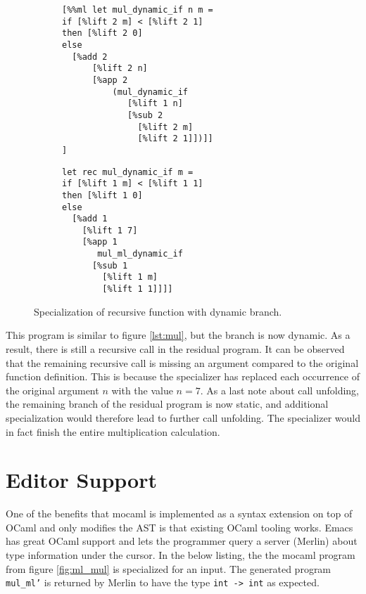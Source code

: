 \begin{figure}[H]
  \centering
  \begin{subfigure}[t]{0.49\linewidth}
\begin{verbatim}
[%%ml let mul_dynamic_if n m =
if [%lift 2 m] < [%lift 2 1]
then [%lift 2 0]
else
  [%add 2
      [%lift 2 n]
      [%app 2
          (mul_dynamic_if                     
             [%lift 1 n]
             [%sub 2
               [%lift 2 m]
               [%lift 2 1]])]]
]
\end{verbatim}
  \end{subfigure}
    \begin{subfigure}[t]{0.49\linewidth}
\begin{verbatim}
let rec mul_dynamic_if m =
if [%lift 1 m] < [%lift 1 1]
then [%lift 1 0]
else
  [%add 1
    [%lift 1 7]
    [%app 1
       mul_ml_dynamic_if
      [%sub 1
        [%lift 1 m]
        [%lift 1 1]]]]
\end{verbatim}
  \end{subfigure}
  \caption{Specialization of recursive function with dynamic branch.}
  \label{fig:dynamic-branch}
\end{figure}

This program is similar to figure \ref{lst:mul}, but the branch is now dynamic. As a result, there is still a recursive call in the residual program. It can be observed that the remaining recursive call is missing an argument compared to the original function definition. This is because the specializer has replaced each occurrence of the original argument $n$ with the value $n=7$. As a last note about call unfolding, the remaining branch of the residual program is now static, and additional specialization would therefore lead to further call unfolding. The specializer would in fact finish the entire multiplication calculation.

\section{Editor Support}

One of the benefits that mocaml is implemented as a syntax extension on top of OCaml and only modifies the AST is that existing OCaml tooling works. Emacs has great OCaml support and lets the programmer query a server (Merlin) about type information under the cursor. In the below listing, the the mocaml program from figure \ref{fig:ml_mul} is specialized for an input. The generated program \texttt{mul\_ml'} is returned by Merlin to have the type \texttt{int -> int} as expected. 

